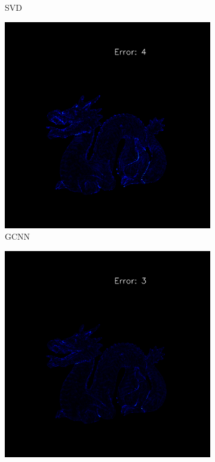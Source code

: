 \begin{figure}[H]
\begin{subfigure}[b]{0.24\linewidth}
		\caption{SVD}
	\end{subfigure}
	\begin{subfigure}[b]{0.24\linewidth}
		\includegraphics[width=\linewidth]{./Figures/comparison_512/fancy_eval_14_error_NNNN-512.png}
		\caption{GCNN}
	\end{subfigure}
	\begin{subfigure}[b]{0.24\linewidth}
		\includegraphics[width=\linewidth]{./Figures/comparison_512/fancy_eval_14_error_Trip-Net-512.png}

\end{subfigure}
\end{figure}
